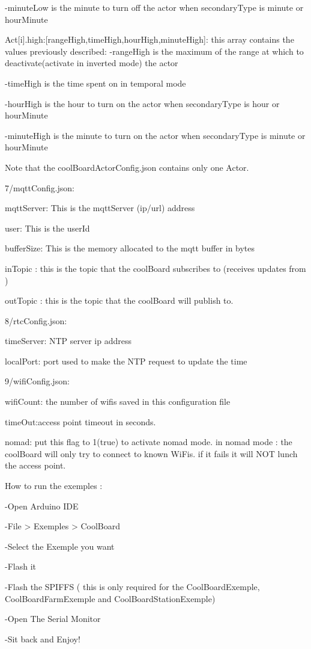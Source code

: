 -\/minute\+Low is the minute to turn off the actor when secondary\+Type is minute or hour\+Minute

\begin{DoxyVerb}Act[i].high:[rangeHigh,timeHigh,hourHigh,minuteHigh]: this array contains the values previously described:
                                                  -rangeHigh is the maximum of the range at which 
                                                  to deactivate(activate in inverted mode) the actor

                                                  -timeHigh is the time spent on in temporal mode

                                                  -hourHigh is the hour to turn on the actor when secondaryType is hour or hourMinute

                                                  -minuteHigh is the minute to turn on the actor when secondaryType is minute or hourMinute


   Note that the coolBoardActorConfig.json contains only one Actor.
\end{DoxyVerb}


7/mqtt\+Config.\+json\+:

mqtt\+Server\+: This is the mqtt\+Server (ip/url) address

user\+: This is the user\+Id

buffer\+Size\+: This is the memory allocated to the mqtt buffer in bytes

in\+Topic \+: this is the topic that the cool\+Board subscribes to (receives updates from )

out\+Topic \+: this is the topic that the cool\+Board will publish to.

8/rtc\+Config.\+json\+:

time\+Server\+: N\+TP server ip address

local\+Port\+: port used to make the N\+TP request to update the time

9/wifi\+Config.\+json\+:

wifi\+Count\+: the number of wifis saved in this configuration file

time\+Out\+:access point timeout in seconds.

nomad\+: put this flag to 1(true) to activate nomad mode. in nomad mode \+: the cool\+Board will only try to connect to known Wi\+Fis. if it fails it will N\+OT lunch the access point.

How to run the exemples \+: \begin{DoxyVerb}-Open Arduino IDE 

-File > Exemples > CoolBoard

-Select the Exemple you want

-Flash it

-Flash the SPIFFS ( this is only required for the CoolBoardExemple, CoolBoardFarmExemple and CoolBoardStationExemple)

-Open The Serial Monitor

-Sit back and Enjoy!
\end{DoxyVerb}


